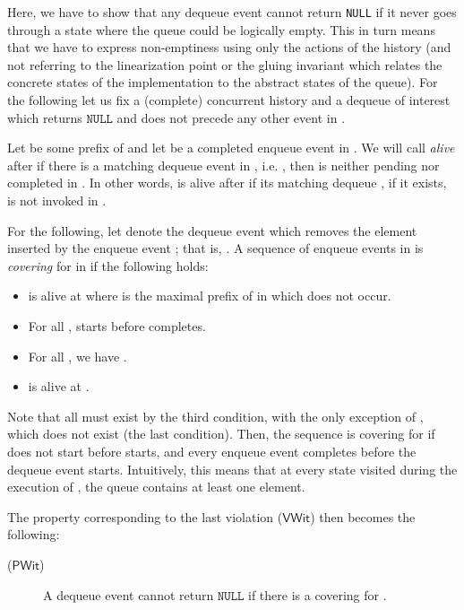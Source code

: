 \documentclass{LMCS}
\newcommand{\NULL}{\ensuremath{\mathtt{NULL}}}
\newcommand{\VWit}{\ensuremath{\mathsf{VWit}}}
\newcommand{\PWit}{\ensuremath{\mathsf{PWit}}}
\begin{document}
Here, we have to show that any dequeue event cannot return \texttt{NULL} if it never goes through a state where the queue could be logically empty.
This in turn means that we have to express non-emptiness using only the actions of the history (and not referring to the linearization point or the gluing invariant which relates the concrete states of the implementation to the abstract states of the queue).
For the following let us fix a (complete) concurrent history  and a dequeue of interest  which returns {\NULL} and does not precede any other event in .

Let  be some prefix of  and let  be a completed enqueue event in .
We will call  {\em alive} after  if there is a matching dequeue event  in , i.e. , 
then  is neither pending nor completed in . 
In other words,  is alive after  if its matching dequeue , if it exists, is not invoked in .

For the following, let  denote the dequeue event which removes the element inserted by the enqueue event ; that is, .
A sequence  of enqueue events in  is {\em covering} for  in  if the following holds:
\begin{itemize}
\item  is alive at  where  is the maximal prefix of  in which  does not occur.
\item For all ,  starts before  completes.
\item For all , we have .
\item  is alive at .
\end{itemize}
Note that all  must exist by the third condition, with the only exception of , which does not exist (the last condition).
Then, the sequence is covering for  if  does not start before  starts, and every enqueue event  completes before the dequeue event  starts.
Intuitively, this means that at every state visited during the execution of , the queue contains at least one element. 

The property corresponding to the last violation (\VWit) then becomes the following:
\begin{description}
\item[(\PWit)] A dequeue event  cannot return {\NULL} if there is a covering for .
\end{description}
\end{document}
